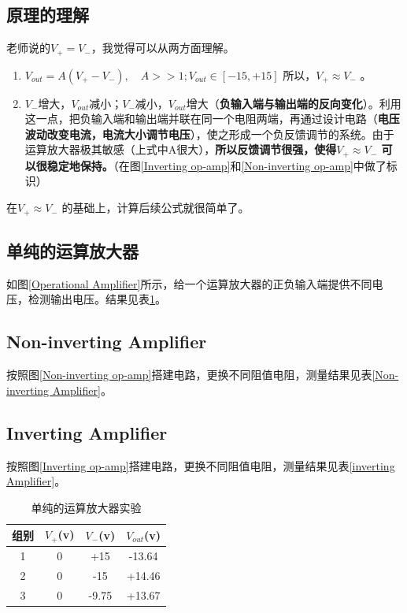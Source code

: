 \documentclass[UTF8]{ctexart}
\begin{document}
\subsection{原理的理解}
老师说的$V_+=V_-$，我觉得可以从两方面理解。
\begin{enumerate}
\item $V_{out}=A(V_+-V_-),\quad A>>1;V_{out} \in [-15,+15]$ 所以，$V_+\approx V_-$ 。
\item $V_-$增大，$V_{out}$减小；$V_-$减小，$V_{out}$增大（\textbf{负输入端与输出端的反向变化}）。利用这一点，把负输入端和输出端并联在同一个电阻两端，再通过设计电路（\textbf{电压波动改变电流，电流大小调节电压}），使之形成一个负反馈调节的系统。由于运算放大器极其敏感（上式中A很大），\textbf{所以反馈调节很强，使得$V_+\approx V_-$ 可以很稳定地保持。}（在图\ref{Inverting op-amp}和\ref{Non-inverting op-amp}中做了标识）

\end{enumerate}
在$V_+\approx V_-$ 的基础上，计算后续公式就很简单了。
\subsection{单纯的运算放大器}
如图\ref{Operational Amplifier}所示，给一个运算放大器的正负输入端提供不同电压，检测输出电压。结果见表\ref{pure op}。

\subsection{Non-inverting Amplifier}
按照图\ref{Non-inverting op-amp}搭建电路，更换不同阻值电阻，测量结果见表\ref{Non-inverting Amplifier}。
\subsection{Inverting Amplifier}
按照图\ref{Inverting op-amp}搭建电路，更换不同阻值电阻，测量结果见表\ref{inverting Amplifier}。
\begin{table}
    \centering
    \begin{tabular}{|c|c|c|c|} \hline 
         组别&  $V_+$(v)&  $V_-$(v)& $V_{out}$(v)\\ \hline 
         1&  0&  +15& -13.64\\ \hline 
         2&  0&  -15& +14.46\\ \hline 
         3&  0&  -9.75& +13.67\\ \hline
    \end{tabular}
    \caption{单纯的运算放大器实验}
    \label{pure op}
\end{table}
\end{document}

